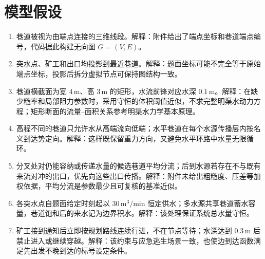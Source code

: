 \section{模型假设}

\begin{enumerate}[label=假设 \arabic*：]
  \item 巷道被视为由端点连接的三维线段。解释：附件给出了端点坐标和巷道端点编号，代码据此构建无向图 $G=(V,E)$。
  \item 突水点、矿工和出口均投影到最近巷道。解释：题面坐标可能不完全等于原始端点坐标，投影后拆分虚拟节点可保持图结构一致。
  \item 巷道横截面为宽 $4\,\mathrm{m}$、高 $3\,\mathrm{m}$ 的矩形，水流前锋对应水深 $0.1\,\mathrm{m}$。解释：在缺少糙率和局部阻力参数时，采用守恒的体积阈值近似，不求完整明渠水动力方程；矩形断面的流量--面积关系参考明渠水力学基本原理\cite{chow1959}。
  \item 高程不同的巷道只允许水从高端流向低端；水平巷道在每个水源传播层内按名义到达势定向。解释：这样既保留重力方向，又避免水平环路中水量无限循环。
  \item 分叉处对仍能容纳或传递水量的候选巷道平均分流；后到水源若存在不与既有来流对冲的出口，优先向这些出口传播。解释：附件未给出粗糙度、压差等加权依据，平均分流是参数最少且可复核的基准近似。
  \item 各突水点自题面给定时刻起以 $30\,\mathrm{m^3/min}$ 恒定供水；多水源共享巷道蓄水容量，巷道饱和后的来水记为边界积水。解释：该处理保证系统总水量守恒。
  \item 矿工接到通知后立即按规划路线连续行进，不在节点等待；水深达到 $0.3\,\mathrm{m}$ 后禁止进入或继续穿越。解释：该约束与应急逃生场景一致，也使边到达函数满足先出发不晚到达的标号设定条件。
\end{enumerate}
